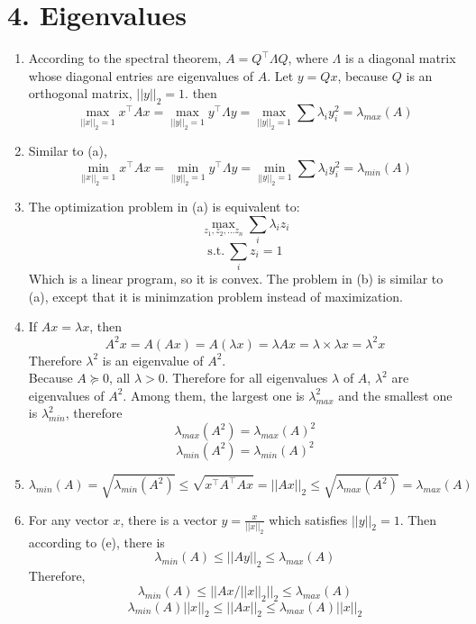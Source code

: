 \documentclass[11pt]{article}
\newenvironment{qparts}{\begin{enumerate}[{(}a{)}]}{\end{enumerate}}
\begin{document}
\section*{4. Eigenvalues}
\begin{qparts}
\item According to the spectral theorem, $A=Q^\top \Lambda Q$, where $\Lambda$ is a diagonal matrix whose diagonal entries are eigenvalues of $A$. Let $y=Qx$, because $Q$ is an orthogonal matrix, $||y||_2=1$. then 
$$\max_{||x||_2=1}x^\top Ax = \max_{||y||_2=1} y^\top \Lambda y = \max_{||y||_2=1} \sum \lambda_i y_i^2 = \lambda_{max}(A)$$

\item Similar to (a), 
$$\min_{||x||_2=1}x^\top Ax = \min_{||y||_2=1} y^\top \Lambda y = \min_{||y||_2=1} \sum \lambda_i y_i^2 = \lambda_{min}(A)$$

\item The optimization problem in (a) is equivalent to:
$$\max_{z_1, z_2, ...z_n}\sum_i \lambda_i z_i$$
$$\mathrm{s. t. }\ \sum_i z_i = 1$$
Which is a linear program, so it is convex. The problem in (b) is similar to (a), except that it is minimzation problem instead of maximization.

\item If $Ax=\lambda x$, then 
$$A^2x = A(Ax) = A(\lambda x) = \lambda Ax = \lambda \times \lambda x = \lambda^2 x$$
Therefore $\lambda^2$ is an eigenvalue of $A^2$.\\
Because $A\succeq 0$, all $\lambda > 0$. Therefore for all eigenvalues $\lambda$ of $A$, $\lambda^2$ are eigenvalues of $A^2$. Among them, the largest one is $\lambda_{max}^2$ and the smallest one is $\lambda_{min}^2$, therefore 
$$\lambda_{max}(A^2)=\lambda_{max}(A)^2$$
$$\lambda_{min}(A^2)=\lambda_{min}(A)^2$$

\item $$\lambda_{min}(A) = \sqrt{\lambda_{min}(A^2)}\leq \sqrt{x^\top A^\top Ax} = ||Ax||_2 \leq \sqrt{\lambda_{max}(A^2)} = \lambda_{max}(A)$$

\item For any vector $x$, there is a vector $y=\frac{x}{||x||_2}$ which satisfies $||y||_2=1$. Then according to (e), there is
$$\lambda_{min}(A) \leq ||Ay||_2 \leq \lambda_{max}(A)$$
Therefore,
$$\lambda_{min}(A) \leq ||Ax/||x||_2||_2 \leq \lambda_{max}(A)$$
$$\lambda_{min}(A)||x||_2 \leq ||Ax||_2 \leq \lambda_{max}(A)||x||_2$$

\end{qparts}


\newpage
\end{document}
